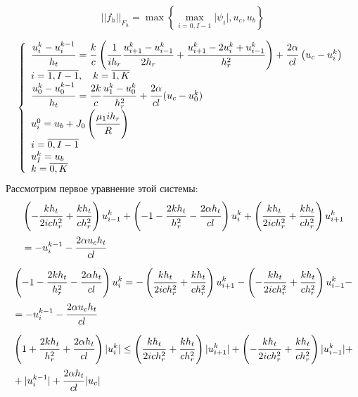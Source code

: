 \documentclass[a4paper,12pt,russian, fleqn]{extreport}
\begin{document}
 	\begin{equation*}
 		\lvert\lvert f_h \rvert\rvert_{F_h} = \max\left\{\max\limits_{i=\overline{0, I-1}}\vert \psi_i \vert, u_c, u_b \right\}
 	\end{equation*}
 	
 	\begin{equation*}
 	\left\{\begin{array}{l}
 	\dfrac{\strut u_i^{k}-u_i^{k-1}}{\strut h_t} = \dfrac{\strut k}{\strut c}\left(\dfrac{\strut 1}{\strut ih_r}\dfrac{\strut u_{i+1}^k - u_{i-1}^k}{\strut 2h_r} +\dfrac{\strut u_{i+1}^k - 2u_i^k + u_{i-1}^k}{\strut h^2_r}\right) + \dfrac{\strut 2\alpha}{\strut cl}\left (u_c - u_i^k \right) \\
 	i = \overline{1,I-1}, \quad k = \overline{1,K}	 \\
 	\dfrac{\strut u_0^{k}-u_0^{k-1}}{\strut h_t} = \dfrac{\strut 2k}{\strut c}\dfrac{\strut u_1^k-u_0^k}{\strut h_r^2} + \dfrac{\strut 2\alpha}{\strut cl}(u_c-u_0^k) \\
 	u_i^0 = u_b + J_0\left( \dfrac{\strut \mu_1 ih_r}{\strut R} \right) \\
 	i = \overline{0, I-1} \\
 	u_I^k = u_b \\
 	k = \overline{0,K}
 	\end{array}\right.
 	\end{equation*}
 	Рассмотрим первое уравнение этой системы:
 	\begin{align}
		& \left(-\dfrac{\strut k h_t}{\strut 2ich_r^2} + \dfrac{\strut k h_t}{\strut c h_r^2}\right) u^k_{i-1} + \left(  - 1 - \dfrac{\strut 2 k h_t}{\strut h_r^2} - \dfrac{\strut 2 \alpha h_t}{\strut cl} \right)u^k_i + \left( \dfrac{\strut k h_t}{\strut 2ich_r^2} + \dfrac{\strut k h_t}{\strut c h_r^2} \right) u^k_{i+1} \nonumber \\ 
		& = -u_i^{k-1} - \dfrac{\strut 2\alpha u_c h_t}{\strut cl} 	\nonumber	
 	\end{align}
 	\begin{align}
	 	& \left(  - 1 - \dfrac{\strut 2 k h_t}{\strut h_r^2} - \dfrac{\strut 2 \alpha h_t}{\strut cl} \right)u^k_i = - \left( \dfrac{\strut k h_t}{\strut 2ich_r^2} + \dfrac{\strut k h_t}{\strut c h_r^2} \right) u^k_{i+1} -\left(-\dfrac{\strut k h_t}{\strut 2ich_r^2} + \dfrac{\strut k h_t}{\strut c h_r^2}\right) u^k_{i-1} - \nonumber \\
		& = -u_i^{k-1} - \dfrac{\strut 2\alpha u_c h_t}{\strut cl} 	\nonumber	
 	\end{align}
 	\begin{align}
	 	& \left(  1 + \dfrac{\strut 2 k h_t}{\strut h_r^2} + \dfrac{\strut 2 \alpha h_t}{\strut cl} \right)\lvert u^k_i \rvert \leq \left( \dfrac{\strut k h_t}{\strut 2ich_r^2} + \dfrac{\strut k h_t}{\strut c h_r^2} \right) \lvert u^k_{i+1} \rvert +\left(-\dfrac{\strut k h_t}{\strut 2ich_r^2} + \dfrac{\strut k h_t}{\strut c h_r^2}\right) \lvert u^k_{i-1} \rvert + \nonumber \\
	 	& + \lvert u_i^{k-1} \rvert + \dfrac{\strut 2\alpha h_t}{\strut cl}\lvert u_c \rvert 	\nonumber	
 	\end{align}
\end{document}

